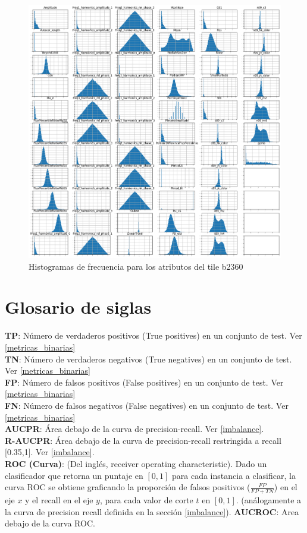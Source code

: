 \begin{appendix}
\begin{figure}[h!]
  \includegraphics[width=\textwidth]{Kap6/allfeatures_b360.png}
    \caption{Histogramas de frecuencia para los atributos del tile b2360}
\end{figure}

\chapter{Glosario de siglas}
\label{glosario}
\textbf{TP}: Número de verdaderos positivos (True positives) en un conjunto de test. Ver \ref{metricas_binarias}\\
\textbf{TN}: Número de verdaderos negativos (True negatives) en un conjunto de test. Ver \ref{metricas_binarias}\\
\textbf{FP}: Número de falsos positivos (False positives) en un conjunto de test. Ver \ref{metricas_binarias}\\
\textbf{FN}: Número de falsos negativos (False negatives) en un conjunto de test. Ver \ref{metricas_binarias}\\
\textbf{AUCPR}: Área debajo de la curva de precision-recall. Ver \ref{imbalance}.\\
\textbf{R-AUCPR}: Área debajo de la curva de precision-recall restringida a recall [0.35,1]. Ver \ref{imbalance}. \\
\textbf{ROC (Curva)}: (Del inglés, receiver operating characteristic). Dado un clasificador que retorna un puntaje en $[0,1]$ para cada instancia a clasificar, la curva ROC se obtiene graficando la proporción de falsos positivos ($\frac{FP}{FP+TN}$) en el eje $x$  y el recall en el eje $y$, para cada valor de corte $t$ en $[0,1]$. (análogamente a la curva de precision recall definida en la sección \ref{imbalance}).
\textbf{AUCROC}: Area debajo de la curva ROC. \\

\end{appendix}
